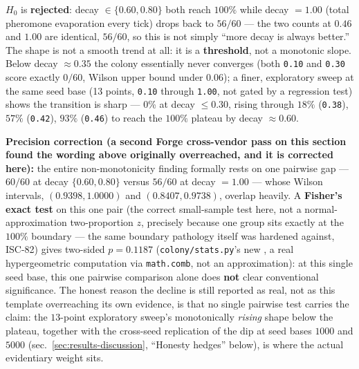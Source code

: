 \documentclass[
  english,
]{article}
\theoremstyle{definition}
\begin{document}
\(H_0\) is \textbf{rejected}: decay \(\in \{0.60, 0.80\}\) both reach
\(100\%\) while decay \(=1.00\) (total pheromone evaporation every tick)
drops back to \(56/60\) --- the two counts at \(0.46\) and \(1.00\) are
identical, \(56/60\), so this is not simply ``more decay is always
better.'' The shape is not a smooth trend at all: it is a
\textbf{threshold}, not a monotonic slope. Below decay \(\approx 0.35\)
the colony essentially never converges (both \texttt{0.10} and
\texttt{0.30} score exactly \(0/60\), Wilson upper bound under
\(0.06\)); a finer, exploratory sweep at the same seed base (13 points,
\texttt{0.10} through \texttt{1.00}, not gated by a regression test)
shows the transition is sharp --- 0\% at decay \(\le 0.30\), rising
through \(18\%\) (\texttt{0.38}), \(57\%\) (\texttt{0.42}), \(93\%\)
(\texttt{0.46}) to reach the \(100\%\) plateau by decay
\(\approx 0.60\).

\textbf{Precision correction (a second Forge cross-vendor pass on this
section found the wording above originally overreached, and it is
corrected here):} the entire non-monotonicity finding formally rests on
one pairwise gap --- \(60/60\) at decay \(\{0.60,0.80\}\) versus
\(56/60\) at decay \(=1.00\) --- whose Wilson intervals,
\((0.9398, 1.0000)\) and \((0.8407, 0.9738)\), overlap heavily. A
\textbf{Fisher's exact test} on this one pair (the correct small-sample
test here, not a normal-approximation two-proportion \(z\), precisely
because one group sits exactly at the \(100\%\) boundary --- the same
boundary pathology  itself was hardened
against, ISC-82) gives two-sided \(p = 0.1187\)
(\texttt{colony/stats.py}'s new
, a real hypergeometric
computation via \texttt{math.comb}, not an approximation): at this
single seed base, this one pairwise comparison alone does \textbf{not}
clear conventional significance. The honest reason the decline is still
reported as real, not as this template overreaching its own evidence, is
that no single pairwise test carries the claim: the \(13\)-point
exploratory sweep's monotonically \emph{rising} shape below the plateau,
together with the cross-seed replication of the dip at seed bases
\(1000\) and \(5000\) (sec.~\ref{sec:results-discussion}, ``Honesty
hedges'' below), is where the actual evidentiary weight sits.
\end{document}
